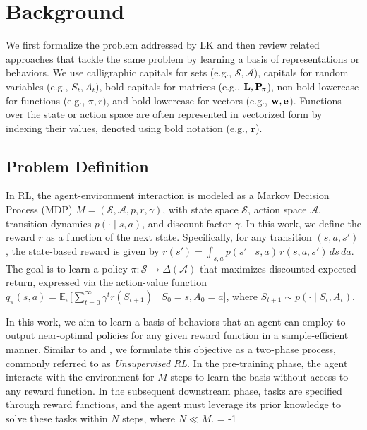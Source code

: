 \documentclass{article}
\theoremstyle{plain}
\theoremstyle{definition}
\theoremstyle{remark}
\begin{document}
\section{Background}

We first formalize the problem addressed by LK and then review related approaches that tackle the same problem by learning a basis of representations or behaviors. We use calligraphic capitals for sets (e.g., $\mathscr{S}, \mathscr{A}$), capitals for random variables (e.g., $S_t, A_t$), bold capitals for matrices (e.g., $\mathbf{L}, \mathbf{P}_{\!\pi}$), non-bold lowercase for functions (e.g., $\pi, r$), and bold lowercase for vectors (e.g., $\mathbf{w}, \mathbf{e}$). Functions over the state or action space are often represented in vectorized form by indexing their values, denoted using bold notation (e.g., $\mathbf{r}$). 


\subsection{Problem Definition}

In RL, the agent-environment interaction is modeled as a Markov Decision Process (MDP) $M = (\mathscr{S}, \mathscr{A}, p, r, \gamma)$, with state space $\mathscr{S}$, action space $\mathscr{A}$, transition dynamics $p(\cdot\mid s,a)$, and discount factor $\gamma$. In this work, we define the reward $r$ as a function of the next state. Specifically, for any transition $(s, a, s')$, the state-based reward is given by $r(s') = \int_{s,a} p(s' \mid s, a)\, r(s, a, s') \, ds \, da$. The goal is to learn a policy $\pi:\mathscr{S} \to \Delta(\mathscr{A})$ that maximizes discounted expected return, expressed via the action-value function $q_\pi(s,a) = \mathbb{E}_\pi\Big[\sum_{t=0}^\infty \gamma^t r(S_{t+1}) \mid S_0=s, A_0=a \Big]$, where $S_{t+1} \sim p(\cdot\mid S_t,A_t)$.

In this work, we aim to learn a basis of behaviors that an agent can employ to output near-optimal policies for any given reward function in a sample-efficient manner. Similar to \citet{touati2022does} and \citet{agarwal2025proto}, we formulate this objective as a two-phase process, commonly referred to as \textit{Unsupervised RL}. In the pre-training phase, the agent interacts with the environment for $M$ steps to learn the basis without access to any reward function. In the subsequent downstream phase, tasks are specified through reward functions, and the agent must leverage its prior knowledge to solve these tasks within $N$ steps, where $N \ll M$. \looseness = -1
\end{document}
